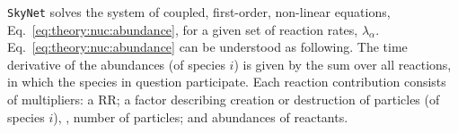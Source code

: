\texttt{SkyNet} solves the system of coupled, first-order, non-linear equations, 
Eq.~\eqref{eq:theory:nuc:abundance}, for a given set of reaction rates, $\lambda_{\alpha}$. 
Eq.~\eqref{eq:theory:nuc:abundance} can be understood as following. 
The time derivative of the abundances (of species $i$) is given by the sum over all reactions, 
in which the species in question participate. Each reaction contribution consists of multipliers: 
a \ac{RR}; a factor describing creation or destruction of particles (of species $i$), 
\ie, number of particles; and abundances of reactants. 
%
%
%
%
